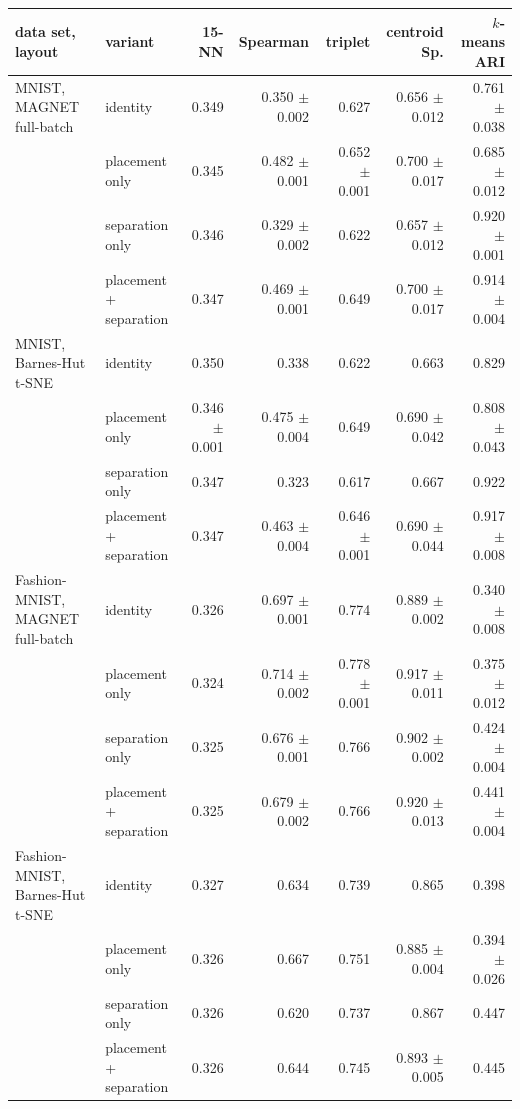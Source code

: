 \begin{tabular}{llrrrrr}
\toprule
data set, layout & variant & 15-NN & Spearman & triplet & centroid Sp. & $k$-means ARI \\
\midrule
MNIST, MAGNET full-batch & identity & 0.349 & 0.350 $\pm$ 0.002 & 0.627 & 0.656 $\pm$ 0.012 & 0.761 $\pm$ 0.038 \\
 & placement only & 0.345 & 0.482 $\pm$ 0.001 & 0.652 $\pm$ 0.001 & 0.700 $\pm$ 0.017 & 0.685 $\pm$ 0.012 \\
 & separation only & 0.346 & 0.329 $\pm$ 0.002 & 0.622 & 0.657 $\pm$ 0.012 & 0.920 $\pm$ 0.001 \\
 & placement + separation & 0.347 & 0.469 $\pm$ 0.001 & 0.649 & 0.700 $\pm$ 0.017 & 0.914 $\pm$ 0.004 \\
\midrule
MNIST, Barnes-Hut t-SNE & identity & 0.350 & 0.338 & 0.622 & 0.663 & 0.829 \\
 & placement only & 0.346 $\pm$ 0.001 & 0.475 $\pm$ 0.004 & 0.649 & 0.690 $\pm$ 0.042 & 0.808 $\pm$ 0.043 \\
 & separation only & 0.347 & 0.323 & 0.617 & 0.667 & 0.922 \\
 & placement + separation & 0.347 & 0.463 $\pm$ 0.004 & 0.646 $\pm$ 0.001 & 0.690 $\pm$ 0.044 & 0.917 $\pm$ 0.008 \\
\midrule
Fashion-MNIST, MAGNET full-batch & identity & 0.326 & 0.697 $\pm$ 0.001 & 0.774 & 0.889 $\pm$ 0.002 & 0.340 $\pm$ 0.008 \\
 & placement only & 0.324 & 0.714 $\pm$ 0.002 & 0.778 $\pm$ 0.001 & 0.917 $\pm$ 0.011 & 0.375 $\pm$ 0.012 \\
 & separation only & 0.325 & 0.676 $\pm$ 0.001 & 0.766 & 0.902 $\pm$ 0.002 & 0.424 $\pm$ 0.004 \\
 & placement + separation & 0.325 & 0.679 $\pm$ 0.002 & 0.766 & 0.920 $\pm$ 0.013 & 0.441 $\pm$ 0.004 \\
\midrule
Fashion-MNIST, Barnes-Hut t-SNE & identity & 0.327 & 0.634 & 0.739 & 0.865 & 0.398 \\
 & placement only & 0.326 & 0.667 & 0.751 & 0.885 $\pm$ 0.004 & 0.394 $\pm$ 0.026 \\
 & separation only & 0.326 & 0.620 & 0.737 & 0.867 & 0.447 \\
 & placement + separation & 0.326 & 0.644 & 0.745 & 0.893 $\pm$ 0.005 & 0.445 \\
\bottomrule
\end{tabular}

